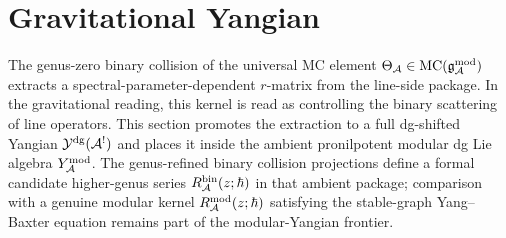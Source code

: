 %

\section{Gravitational Yangian}
\label{sec:thqg-gravitational-yangian}

\providecommand{\Rescoll}{\operatorname{Res}^{\mathrm{coll}}}
\providecommand{\Fcoll}{F^{\bullet}_{\mathrm{coll}}}
\providecommand{\grcoll}{\operatorname{gr}_{\mathrm{coll}}}
\providecommand{\Sh}{\operatorname{Sh}}
\providecommand{\Aut}{\operatorname{Aut}}
\providecommand{\Hom}{\operatorname{Hom}}
\providecommand{\End}{\operatorname{End}}
\providecommand{\Tr}{\operatorname{Tr}}
\providecommand{\Sym}{\operatorname{Sym}}
\providecommand{\ad}{\operatorname{ad}}
\providecommand{\Res}{\operatorname{Res}}
\providecommand{\Spec}{\operatorname{Spec}}
\providecommand{\id}{\mathrm{id}}
\providecommand{\rank}{\operatorname{rank}}
\providecommand{\cofib}{\operatorname{cofib}}
\providecommand{\Ymod}{Y^{\mathrm{mod}}}
\providecommand{\ModEnv}{\operatorname{ModEnv}}
\providecommand{\CE}{\operatorname{CE}}
\providecommand{\wt}{\operatorname{wt}}
\providecommand{\HS}{\operatorname{HS}}
\providecommand{\Fred}{\operatorname{Fred}}
\providecommand{\Det}{\operatorname{Det}}
\providecommand{\FM}{\overline{\operatorname{FM}}}
\providecommand{\Rgrav}{R^{\mathrm{grav}}}
\providecommand{\rgrav}{r^{\mathrm{grav}}}

The genus-zero binary collision of the universal MC element
$\Theta_{\mathcal{A}} \in \mathrm{MC}(\mathfrak{g}_{\mathcal{A}}^{\mathrm{mod}})$ extracts a spectral-parameter-dependent
$r$-matrix from the line-side package. In the gravitational reading,
this kernel is read as controlling the binary scattering of line
operators. This section promotes the extraction to a full dg-shifted Yangian
$\mathcal{Y}^{\mathrm{dg}}(\mathcal{A}^!)$ and places it inside the ambient pronilpotent modular
dg Lie algebra $\Ymod_\cA$. The genus-refined binary collision
projections define a formal candidate higher-genus series
$R^{\mathrm{bin}}_{\mathcal{A}}(z;\hbar)$ in that ambient package; comparison
with a genuine modular kernel
$R^{\mathrm{mod}}_{\mathcal{A}}(z;\hbar)$ satisfying the stable-graph
Yang--Baxter equation remains part of the modular-Yangian frontier.


